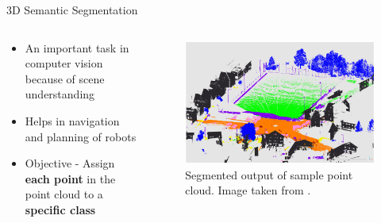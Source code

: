 \documentclass[aspectratio=169]{beamer}
\begin{document}
\begin{frame}{3D Semantic Segmentation}
    \begin{columns}
       \begin{column}{0.4\textwidth}
            \begin{itemize}
                \item An important task in computer vision because of scene understanding
                \item Helps in navigation and planning of robots
                \item Objective - Assign \textbf{each point} in the point cloud to a \textbf{specific class}
            \end{itemize}       
       \end{column}
       \begin{column}{0.6\textwidth}
            \begin{figure}
                \centering
                \includegraphics[scale=0.3]{images/sample_LiDAR_PC_segmented.jpg}
                \caption{Segmented output of sample point cloud. Image taken from \cite{hackel2017semantic3d}.}
                \label{fig:sample_lidar_pc_segmented}
            \end{figure}
       \end{column}
    \end{columns}
\end{frame}
\end{document}
